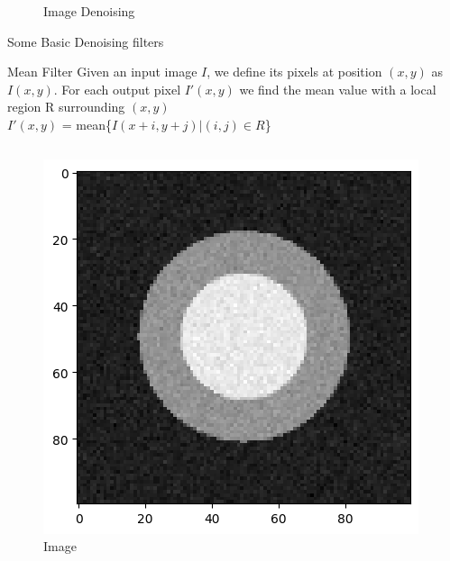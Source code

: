 \documentclass{beamer}
\begin{document}
\begin{frame}[t]
\begin{figure}[!ht]
{
  }
  \caption{Image Denoising}
\end{figure}
\end{frame}

\begin{frame}{Some Basic Denoising filters}
    \begin{block}{Mean Filter}
    Given an input image $I$, we define its pixels at position $(x,y)$  as $I(x,y)$.
For each output pixel  $I'(x,y)$  we find the mean value with a local region R  surrounding $(x,y)$\\ 
$I'(x,y)$ = mean\{$I(x+i,y+j)|(i, j) \in R$\}
    \end{block}
    
    \begin{columns}
            \begin{figure}
                \centering
                \includegraphics[scale = 0.4]{img/noisy_im.png}
                \caption{Image}
                \label{fig:dual fig demo 1}
            \end{figure}
            

\end{columns}
\end{frame}
\end{document}
